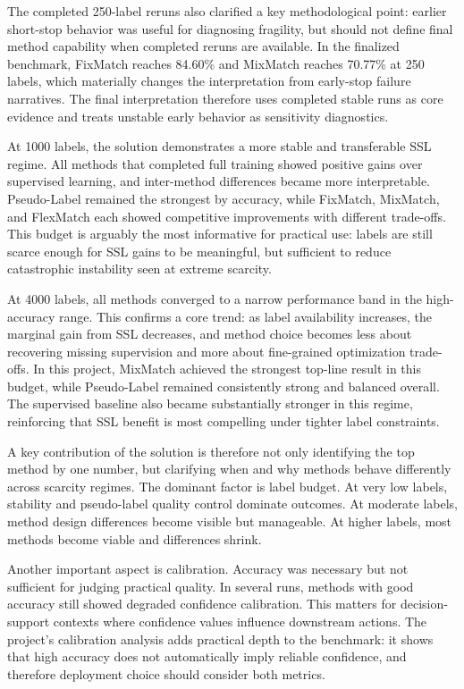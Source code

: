The completed 250-label reruns also clarified a key methodological point: earlier short-stop behavior was useful for diagnosing fragility, but should not define final method capability when completed reruns are available. In the finalized benchmark, FixMatch reaches 84.60\% and MixMatch reaches 70.77\% at 250 labels, which materially changes the interpretation from early-stop failure narratives. The final interpretation therefore uses completed stable runs as core evidence and treats unstable early behavior as sensitivity diagnostics.

At 1000 labels, the solution demonstrates a more stable and transferable SSL regime. All methods that completed full training showed positive gains over supervised learning, and inter-method differences became more interpretable. Pseudo-Label remained the strongest by accuracy, while FixMatch, MixMatch, and FlexMatch each showed competitive improvements with different trade-offs. This budget is arguably the most informative for practical use: labels are still scarce enough for SSL gains to be meaningful, but sufficient to reduce catastrophic instability seen at extreme scarcity.

At 4000 labels, all methods converged to a narrow performance band in the high-accuracy range. This confirms a core trend: as label availability increases, the marginal gain from SSL decreases, and method choice becomes less about recovering missing supervision and more about fine-grained optimization trade-offs. In this project, MixMatch achieved the strongest top-line result in this budget, while Pseudo-Label remained consistently strong and balanced overall. The supervised baseline also became substantially stronger in this regime, reinforcing that SSL benefit is most compelling under tighter label constraints.

A key contribution of the solution is therefore not only identifying the top method by one number, but clarifying when and why methods behave differently across scarcity regimes. The dominant factor is label budget. At very low labels, stability and pseudo-label quality control dominate outcomes. At moderate labels, method design differences become visible but manageable. At higher labels, most methods become viable and differences shrink.

Another important aspect is calibration. Accuracy was necessary but not sufficient for judging practical quality. In several runs, methods with good accuracy still showed degraded confidence calibration. This matters for decision-support contexts where confidence values influence downstream actions. The project's calibration analysis adds practical depth to the benchmark: it shows that high accuracy does not automatically imply reliable confidence, and therefore deployment choice should consider both metrics.

